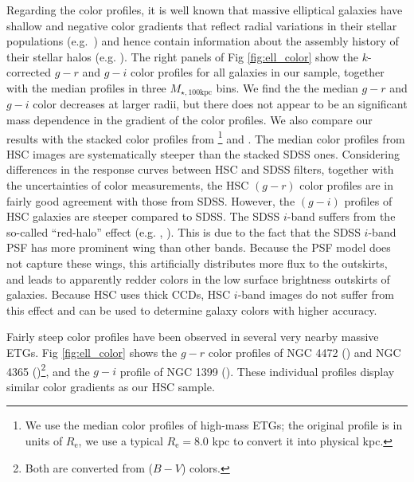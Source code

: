 \documentclass[a4paper,fleqn,usenatbib]{mnras}
\def\mtot{{$M_{\star,100\mathrm{kpc}}$}}
\begin{document}
    Regarding the color profiles, it is well known that massive elliptical galaxies 
    have shallow and negative color gradients that reflect radial variations in their  
    stellar populations (e.g.\ \citealt{Carollo1993, LaBarbera2012}) and hence contain
    information about the assembly history of their stellar halos (e.g. 
    \citealt{Hirschmann2015}). 
    The right panels of Fig \ref{fig:ell_color} show the $k$-corrected $g-r$ and 
    $g-i$ color profiles for all galaxies in our sample, together with the median profiles in three \mtot{} bins. We find the the  median $g-r$ and $g-i$ color  decreases  at larger radii, but there does not appear to be an significant mass dependence in the  gradient of the color profiles. We also compare our results with the stacked color profiles from  \citealt{LaBarbera2010}\footnote{We use the median color profiles of high-mass 
    ETGs; the original profile is in units of $R_{\mathrm{e}}$, we use a typical 
    $R_{\mathrm{e}}=8.0$ kpc to convert it into physical kpc.} and 
    \citealt{DSouza2014}.
    The median color profiles from HSC images are systematically steeper than the 
    stacked SDSS ones. 
    Considering differences in the response curves between HSC and SDSS filters, together with the uncertainties of color measurements, the HSC $(g-r)$ color profiles are  in fairly good agreement with  those from SDSS. However, the $(g-i)$ profiles of HSC galaxies are steeper compared to SDSS. The SDSS $i$-band suffers from the so-called ``red-halo'' effect
    (e.g. \citealt{Wu2005}, \citealt{Tal2011}).  This is due to  the fact that the SDSS $i$-band PSF has more prominent wing than other bands. Because the PSF model does not capture these wings, this artificially distributes more flux to the outskirts, and leads to apparently redder colors in 
    the low surface brightness outskirts of galaxies. Because HSC uses thick CCDs, HSC $i$-band images do not suffer from this effect and can be used to determine galaxy colors with higher accuracy. 
        
    
    Fairly steep color profiles have been observed in several very nearby massive 
    ETGs.  Fig \ref{fig:ell_color} shows the $g-r$ color profiles of 
    NGC 4472 (\citealt{Mihos2013}) and NGC 4365 (\citealt{Mihos2017})\footnote{
    Both are converted from ($B-V$) colors.}, and the $g-i$ profile of NGC 1399 
    (\citealt{Iodice2016}). These individual profiles  display  similar color gradients as our HSC sample.   
    
\end{document}

